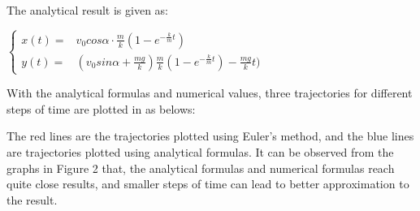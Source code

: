 \documentclass{book}
\begin{document}
\quad The analytical result is given as:

\quad $\begin{cases}
    x(t)= & v_{0}cos\alpha \cdot \frac{m}{k}(1-e^{-\frac{k}{m}t})                          \\
    y(t)= & (v_{0}sin\alpha + \frac{mg}{k})\frac{m}{k}(1-e^{-\frac{k}{m}t})-\frac{mg}{k}t)
  \end{cases}$

With the analytical formulas and numerical values, three trajectories for different steps of time are plotted in as belows:

The red lines are the trajectories plotted using Euler's method, and the blue lines are trajectories plotted using analytical formulas. It can be observed from the graphs in Figure 2 that, the analytical formulas and numerical formulas reach quite close results, and smaller steps of time can lead to better approximation to the result.
\end{document}
